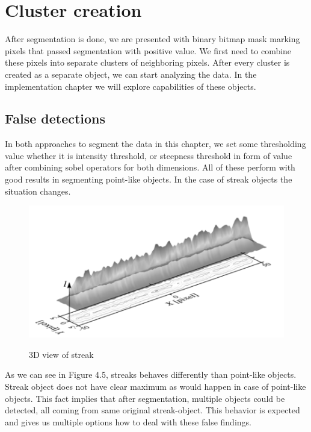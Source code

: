 \documentclass[12pt, a4paper, oneside]{book}
\begin{document}
\section{Cluster creation}
After segmentation is done, we are presented with binary bitmap mask marking pixels that passed segmentation with positive value.
We first need to combine these pixels into separate clusters of neighboring pixels.
After every cluster is created as a separate object, we can start analyzing the data.
In the implementation chapter we will explore capabilities of these objects.

\subsection{False detections}

In both approaches to segment the data in this chapter, we set some thresholding value whether it is intensity threshold, or steepness threshold in form of value after combining sobel operators for both dimensions.
All of these perform with good results in segmenting point-like objects.
In the case of streak objects the situation changes.

\begin{figure}[H]
    \begin{center}
        \includegraphics[scale=1.50]{images/streak3d.png}
        \label{img:joined_objects}
        \caption{3D view of streak \cite{kouprianov}}
    \end{center}
\end{figure}

As we can see in Figure 4.5, streaks behaves differently than point-like objects.
Streak object does not have clear maximum as would happen in case of point-like objects.
This fact implies that after segmentation, multiple objects could be detected, all coming from same original streak-object.
This behavior is expected and gives us multiple options how to deal with these false findings.
\end{document}
